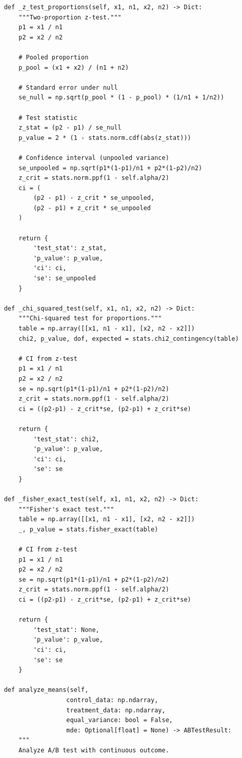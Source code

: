 \begin{lstlisting}
    def _z_test_proportions(self, x1, n1, x2, n2) -> Dict:
        """Two-proportion z-test."""
        p1 = x1 / n1
        p2 = x2 / n2

        # Pooled proportion
        p_pool = (x1 + x2) / (n1 + n2)

        # Standard error under null
        se_null = np.sqrt(p_pool * (1 - p_pool) * (1/n1 + 1/n2))

        # Test statistic
        z_stat = (p2 - p1) / se_null
        p_value = 2 * (1 - stats.norm.cdf(abs(z_stat)))

        # Confidence interval (unpooled variance)
        se_unpooled = np.sqrt(p1*(1-p1)/n1 + p2*(1-p2)/n2)
        z_crit = stats.norm.ppf(1 - self.alpha/2)
        ci = (
            (p2 - p1) - z_crit * se_unpooled,
            (p2 - p1) + z_crit * se_unpooled
        )

        return {
            'test_stat': z_stat,
            'p_value': p_value,
            'ci': ci,
            'se': se_unpooled
        }

    def _chi_squared_test(self, x1, n1, x2, n2) -> Dict:
        """Chi-squared test for proportions."""
        table = np.array([[x1, n1 - x1], [x2, n2 - x2]])
        chi2, p_value, dof, expected = stats.chi2_contingency(table)

        # CI from z-test
        p1 = x1 / n1
        p2 = x2 / n2
        se = np.sqrt(p1*(1-p1)/n1 + p2*(1-p2)/n2)
        z_crit = stats.norm.ppf(1 - self.alpha/2)
        ci = ((p2-p1) - z_crit*se, (p2-p1) + z_crit*se)

        return {
            'test_stat': chi2,
            'p_value': p_value,
            'ci': ci,
            'se': se
        }

    def _fisher_exact_test(self, x1, n1, x2, n2) -> Dict:
        """Fisher's exact test."""
        table = np.array([[x1, n1 - x1], [x2, n2 - x2]])
        _, p_value = stats.fisher_exact(table)

        # CI from z-test
        p1 = x1 / n1
        p2 = x2 / n2
        se = np.sqrt(p1*(1-p1)/n1 + p2*(1-p2)/n2)
        z_crit = stats.norm.ppf(1 - self.alpha/2)
        ci = ((p2-p1) - z_crit*se, (p2-p1) + z_crit*se)

        return {
            'test_stat': None,
            'p_value': p_value,
            'ci': ci,
            'se': se
        }

    def analyze_means(self,
                     control_data: np.ndarray,
                     treatment_data: np.ndarray,
                     equal_variance: bool = False,
                     mde: Optional[float] = None) -> ABTestResult:
        """
        Analyze A/B test with continuous outcome.


\end{lstlisting}
